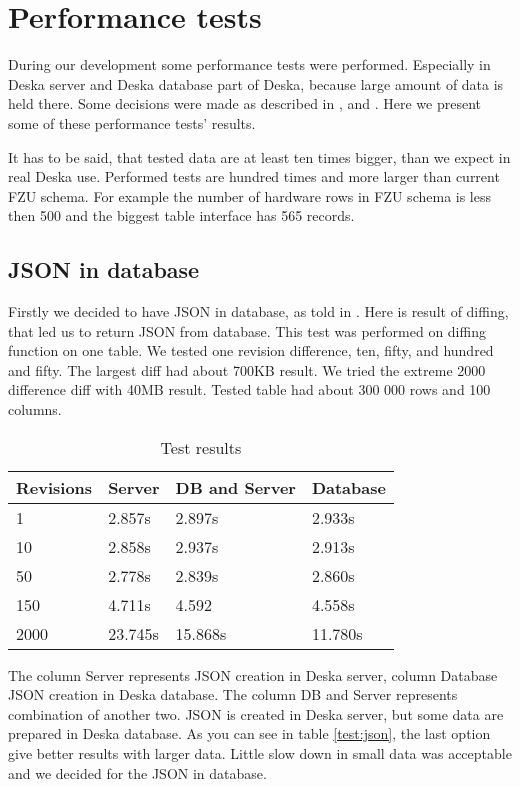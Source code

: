 \documentclass[deska]{subfiles}
\begin{document}
\section{Performance tests}
\label{sec:performance}

During our development some performance tests were performed. Especially in Deska server and Deska database
part of Deska, because large amount of data is held there. Some decisions were made as described in
,  and .
Here we present some of these performance tests' results.

It has to be said, that tested data are at least ten times bigger, than we
expect in real Deska use. Performed tests are hundred times and more larger
than current FZU schema.
For example the number of hardware rows in FZU schema is less then 500 
and the biggest table interface has 565 records.

\subsection{JSON in database}
\label{sec:test-json}
Firstly we decided to have JSON in database, as told in .
Here is result of diffing, that led us to
return JSON from database.
This test was performed on diffing function on one table.
We tested one revision difference, ten, fifty, and hundred and fifty.
The largest diff had about 700KB result.
We tried the extreme 2000 difference diff with 40MB result.
Tested table had about 300 000 rows and 100 columns.

\label{test:json}
\begin{longtable}{ l | l | l | l}
\caption{Test results} \\
Revisions & Server & DB and Server & Database \\
\hline
\endhead
1 & 2.857s & 2.897s & 2.933s \\
10 & 2.858s & 2.937s & 2.913s \\
50 & 2.778s & 2.839s & 2.860s \\
150 & 4.711s & 4.592 & 4.558s \\
2000 & 23.745s & 15.868s & 11.780s \\
\end{longtable}

The column Server represents JSON creation in Deska server, column Database JSON creation in
Deska database. The column DB and Server represents combination of another two. JSON is created
in Deska server, but some data are prepared in Deska database.
As you can see in table \ref{test:json}, the last option give better results with larger data.
Little slow down in small data was acceptable and we decided for the JSON in database.
\end{document}
